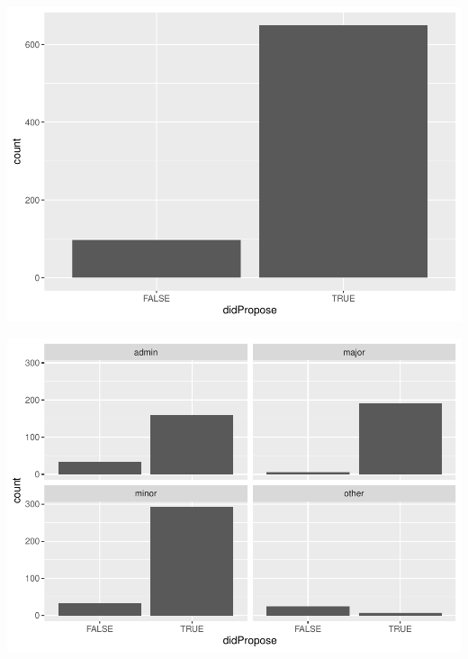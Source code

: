 \documentclass[]{article}
\newenvironment{Shaded}{\begin{snugshade}}{\end{snugshade}}
\newcommand{\KeywordTok}[1]{\textcolor[rgb]{0.13,0.29,0.53}{\textbf{#1}}}
\newcommand{\NormalTok}[1]{#1}
\newcommand{\OperatorTok}[1]{\textcolor[rgb]{0.81,0.36,0.00}{\textbf{#1}}}
\newcommand{\StringTok}[1]{\textcolor[rgb]{0.31,0.60,0.02}{#1}}
\begin{document}
\begin{Shaded}
\end{Shaded}

\includegraphics{ProposalAnalysis_files/figure-latex/unnamed-chunk-9-5.pdf}

\begin{Shaded}
\end{Shaded}

\includegraphics{ProposalAnalysis_files/figure-latex/unnamed-chunk-9-6.pdf}
\end{document}
